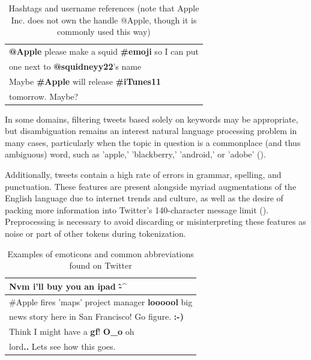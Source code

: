 \documentclass[letterpaper]{article}
\begin{document}
\begin{table}[h]
\centering
\begin{tabular}{|l|}
	\hline
\textbf{@Apple} please make a squid \textbf{\#emoji} so I can put \\
one next to \textbf{@squidneyy22}'s name\\ \hline
Maybe \textbf{\#Apple} will release \textbf{\#iTunes11} \\
tomorrow. Maybe? \\ \hline
\end{tabular}
\caption{Hashtags and username references (note that Apple Inc. does not own the handle @Apple, though it is commonly used this way)}
\label{tab:myfirsttable}
\end{table}

In some domains, filtering tweets based solely on keywords may be appropriate, but disambiguation remains an interest natural language processing problem in many cases, particularly when the topic in question is a commonplace (and thus ambiguous) word, such as 'apple,' 'blackberry,' 'android,' or 'adobe' (\citeauthor{journals/ijcsa/YervaMA12}). 

Additionally, tweets contain a high rate of errors in grammar, spelling, and punctuation. These features are present alongside myriad augmentations of the English language due to internet trends and culture, as well as the desire of packing more information into Twitter's 140-character message limit (\citeauthor{Laboreiro:2010:TMM:1871840.1871853}). Preprocessing is necessary to avoid discarding or misinterpreting these features as noise or part of other tokens during tokenization.

\begin{table}[h]
\centering
\begin{tabular}{|l|}
	\hline
\textbf{Nvm} i'll buy you an ipad \textbf{\^-\^} \\ \hline
\#Apple fires 'maps' project manager \textbf{loooool} big \\
 news story here in San Francisco! Go figure. \textbf{:-)} \\ \hline
Think I might have a \textbf{gf}! \textbf{O\_o} oh \\
lord\textbf{..} Lets see how this goes. \\ \hline
\end{tabular}
\caption{Examples of emoticons and common abbreviations found on Twitter}
\label{tab:myfirsttable}
\end{table}
\end{document}

